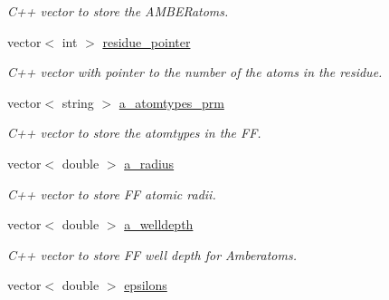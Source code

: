 \begin{DoxyCompactItemize}
\begin{DoxyCompactList}\small\item\em C++ vector to store the AMBERatoms. \item\end{DoxyCompactList}\item 
\hypertarget{classPRMTOP_a0967f676f9011344e7b00edf5b09f808}{
vector$<$ int $>$ \hyperlink{classPRMTOP_a0967f676f9011344e7b00edf5b09f808}{residue\_\-pointer}}
\label{classPRMTOP_a0967f676f9011344e7b00edf5b09f808}

\begin{DoxyCompactList}\small\item\em C++ vector with pointer to the number of the atoms in the residue. \item\end{DoxyCompactList}\item 
\hypertarget{classPRMTOP_a69bebe395149b367f27747d6f6291d8e}{
vector$<$ string $>$ \hyperlink{classPRMTOP_a69bebe395149b367f27747d6f6291d8e}{a\_\-atomtypes\_\-prm}}
\label{classPRMTOP_a69bebe395149b367f27747d6f6291d8e}

\begin{DoxyCompactList}\small\item\em C++ vector to store the atomtypes in the FF. \item\end{DoxyCompactList}\item 
\hypertarget{classPRMTOP_a5de8b26b6a9ee7e3890617a5c77b1c6a}{
vector$<$ double $>$ \hyperlink{classPRMTOP_a5de8b26b6a9ee7e3890617a5c77b1c6a}{a\_\-radius}}
\label{classPRMTOP_a5de8b26b6a9ee7e3890617a5c77b1c6a}

\begin{DoxyCompactList}\small\item\em C++ vector to store FF atomic radii. \item\end{DoxyCompactList}\item 
\hypertarget{classPRMTOP_abcb76ac56534cf67fc883e16ab63a850}{
vector$<$ double $>$ \hyperlink{classPRMTOP_abcb76ac56534cf67fc883e16ab63a850}{a\_\-welldepth}}
\label{classPRMTOP_abcb76ac56534cf67fc883e16ab63a850}

\begin{DoxyCompactList}\small\item\em C++ vector to store FF well depth for Amberatoms. \item\end{DoxyCompactList}\item 
\hypertarget{classPRMTOP_a54201e31a7caee9b235321cd9c41d568}{
vector$<$ double $>$ \hyperlink{classPRMTOP_a54201e31a7caee9b235321cd9c41d568}{epsilons}}
\label{classPRMTOP_a54201e31a7caee9b235321cd9c41d568}


\end{DoxyCompactItemize}
